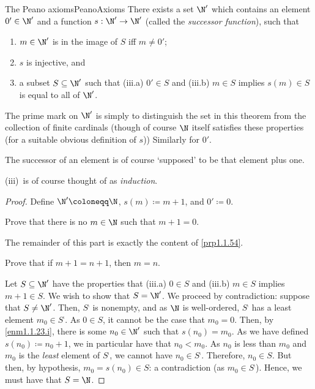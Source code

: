 \begin{thm}{The Peano axioms}{PeanoAxioms}
There exists a set $\N '$ which contains an element $0'\in \N'$ and a function $s:\N '\rightarrow \N '$ (called the \emph{successor function}), such that
\begin{enumerate}
\item \label{enm1.1.23.i}$m\in \N '$ is in the image of $S$ iff $m\neq 0'$;
\item \label{enm1.1.23.ii}$s$ is injective, and
\item \label{enm1.1.23.iii} a subset $S\subseteq \N '$ such that (iii.a) $0'\in S$ and (iii.b) $m\in S$ implies $s(m)\in S$ is equal to all of $\N '$.
\end{enumerate}
\begin{rmk}
The prime mark on $\N '$ is simply to distinguish the set in this theorem from the collection of finite cardinals (though of course $\N$ itself satisfies these properties (for a suitable obvious definition of $s$))  Similarly for $0'$.
\end{rmk}
\begin{rmk}
The successor of an element is of course `supposed' to be that element plus one.
\end{rmk}
\begin{rmk}
(iii)~is of course thought of as \emph{induction}.
\end{rmk}
\begin{proof}
Define $\N '\coloneqq \N$, $s(m)\coloneqq m+1$, and $0'\coloneqq 0$.

\begin{exr}[breakable=false]{}{}
Prove that there is no $m\in \N$ such that $m+1=0$.
\end{exr}
The remainder of this part is exactly the content of \cref{prp1.1.54}.

\begin{exr}[breakable=false]{}{}
Prove that if $m+1=n+1$, then $m=n$.
\end{exr}

Let $S\subseteq \N '$ have the properties that (iii.a) $0\in S$ and (iii.b) $m\in S$ implies $m+1\in S$.  We wish to show that $S=\N '$.  We proceed by contradiction:  suppose that $S\neq \N '$.  Then, $S^{\comp}$ is nonempty, and as $\N$ is well-ordered, $S^{\comp}$ has a least element $m_0\in S^{\comp}$.  As $0\in S$, it cannot be the case that $m_0=0$.  Then, by \cref{enm1.1.23.i}, there is some $n_0\in \N '$ such that $s(n_0)=m_0$.  As we have defined $s(n_0)\coloneqq n_0+1$, we in particular have that $n_0<m_0$.  As $n_0$ is less than $m_0$ and $m_0$ is the \emph{least} element of $S^{\comp}$, we cannot have $n_0\in S^{\comp}$.  Therefore, $n_0\in S$.  But then, by hypothesis, $m_0=s(n_0)\in S$:  a contradiction (as $m_0\in S^{\comp}$).  Hence, we must have that $S=\N$.
\end{proof}
\end{thm}

